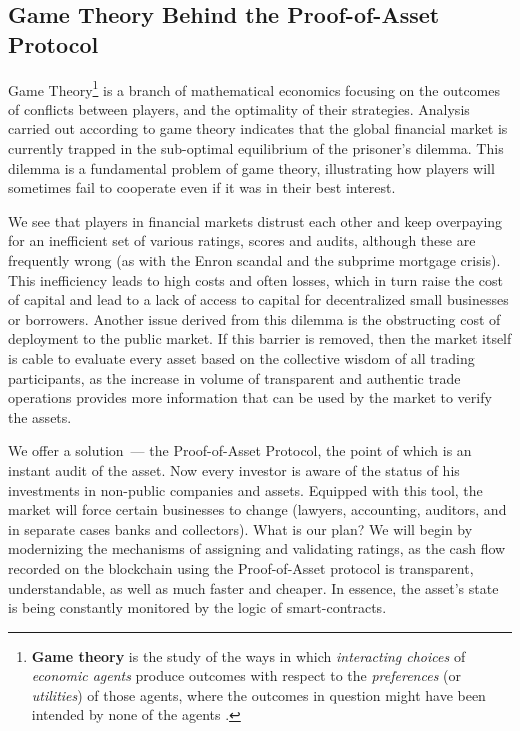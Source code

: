 \documentclass{article}
\begin{document}
\begin{multicols}{2}
\subsection{Game Theory Behind the Proof-of-Asset Protocol}

Game Theory\footnote{\textbf{Game theory} is the study of the ways in which \textit{interacting choices} of \textit{economic agents} produce outcomes with respect to the \textit{preferences} (or \textit{utilities}) of those agents, where the outcomes in question might have been intended by none of the agents \cite{stanfordGameTheory}.} is a branch of mathematical economics focusing on the outcomes of conflicts between players, and the optimality of their strategies. Analysis carried out according to game theory indicates that the global financial market is currently trapped in the sub-optimal equilibrium of the prisoner’s dilemma. This dilemma is a fundamental problem of game theory, illustrating how players will sometimes fail to cooperate even if it was in their best interest.

We see that players in financial markets distrust each other and keep overpaying for an inefficient set of various ratings, scores and audits, although these are frequently wrong (as with the Enron scandal and the subprime mortgage crisis). This inefficiency leads to high costs and often losses, which in turn raise the cost of capital and lead to a lack of access to capital for decentralized small businesses or borrowers. Another issue derived from this dilemma is the obstructing cost of deployment to the public market. If this barrier is removed, then the market itself is cable to evaluate every asset based on the collective wisdom of all trading participants, as the increase in volume of transparent and authentic trade operations provides more information that can be used by the market to verify the assets.

We offer a solution~--- the Proof-of-Asset Protocol, the point of which is an instant audit of the asset. Now every investor is aware of the status of his investments in non-public companies and assets. Equipped with this tool, the market will force certain businesses to change (lawyers, accounting, auditors, and in separate cases banks and collectors). What is our plan? We will begin by modernizing the mechanisms of assigning and validating ratings, as the cash flow recorded on the blockchain using the Proof-of-Asset protocol is transparent, understandable, as well as much faster and cheaper. In essence, the asset’s state is being constantly monitored by the logic of smart-contracts.  


\end{multicols}
\end{document}
